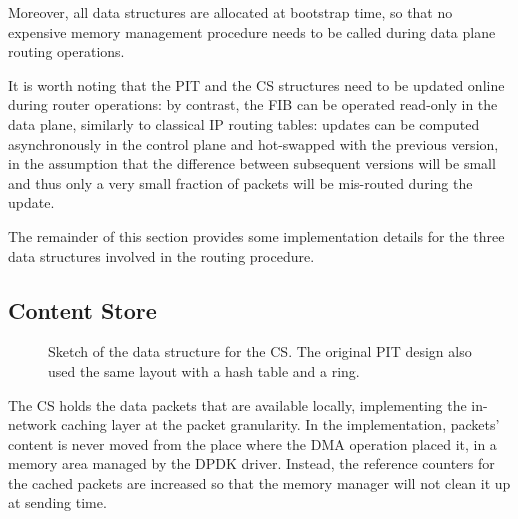 \documentclass[11pt,a4paper,twoside,titlepage,openany]{book}
\begin{document}
Moreover, all data structures are allocated at bootstrap time, so that no expensive memory management procedure needs to be called during data plane routing operations.

It is worth noting that the \gls{PIT} and the \gls{CS} structures need to be updated online during router operations: by contrast, the \gls{FIB} can be operated read-only in the data plane, similarly to classical IP routing tables: updates can be computed asynchronously in the control plane and hot-swapped with the previous version, in the assumption that the difference between subsequent versions will be small and thus only a very small fraction of packets will be mis-routed during the update.

The remainder of this section provides some implementation details for the three data structures involved in the routing procedure.

\subsection{Content Store}\label{sec:augustus.cs}
\begin{figure}[tb]
  \begin{center}
    \caption[Sketch for the data structure for the CS and orignal PIT.]{Sketch of the data structure for the CS. The original PIT design also used the same layout with a hash table and a ring.}
    \label{fig:augustus.ht_ring}
  \end{center}
\end{figure}

The \gls{CS} holds the data packets that are available locally, implementing the in-network caching layer at the packet granularity. In the implementation, packets' content is never moved from the place where the \gls{DMA} operation placed it, in a memory area managed by the DPDK driver. Instead, the reference counters for the cached packets are increased so that the memory manager will not clean it up at sending time.
\end{document}
